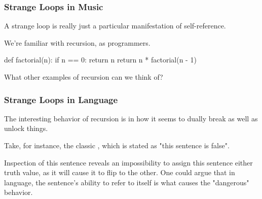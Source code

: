 \documentclass[aspectratio=169]{beamer}
\begin{document}
\begin{frame}[fragile]
  \frametitle{Strange Loops in Music}

  A strange loop is really just a particular manifestation of self-reference.

  \pause
  \vspace{\fill}

  We're familiar with recursion, as programmers.

  \begin{pythoncodeblock}
    def factorial(n):
      if n == 0:
        return n
      return n * factorial(n - 1)
  \end{pythoncodeblock}

  \pause
  \vspace{\fill}

  What other examples of recursion can we think of?
\end{frame}

\begin{frame}[fragile]
  \frametitle{Strange Loops in Language}

  The interesting behavior of recursion is in how it seems to dually break
  as well as unlock things.

  \pause
  \vspace{\fill}

  Take, for instance, the classic , which is stated
  as "this sentence is false".

  \pause
  \vspace{\fill}

  Inspection of this sentence reveals an impossibility to assign this
  sentence either truth value, as it will cause it to flip to the other.
  One could argue that in language, the sentence's ability to refer to
  itself is what causes the "dangerous" behavior.
\end{frame}
\end{document}

